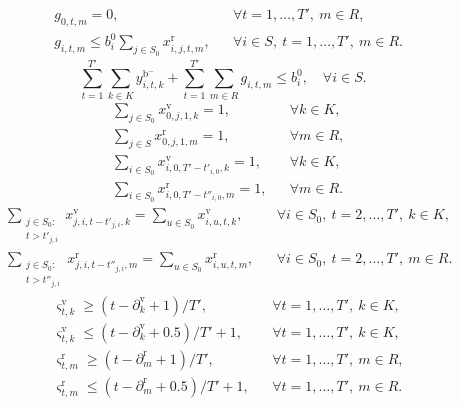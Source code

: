 \begin{subequations}\label{eq:repair-rules}
\begin{align}
&g_{0,t,m}
=0,
&&\forall t=1,\ldots,T',\ m\in R, \label{eq:no-depot-repair}\\
&g_{i,t,m}
\le b_i^0\sum_{j\in S_0}x_{i,j,t,m}^{\mathrm{r}},
&&\forall i\in S,\ t=1,\ldots,T',\ m\in R. \label{eq:repair-visit-link}
\end{align}
\end{subequations}
\begin{equation}
\sum_{t=1}^{T'}\sum_{k\in K}y_{i,t,k}^{\mathrm{b}^{-}}
+\sum_{t=1}^{T'}\sum_{m\in R}g_{i,t,m}
\le b_i^0,
\quad \forall i\in S.
\label{eq:broken-handling-limit}
\end{equation}
\begin{subequations}\label{eq:start-return}
\begin{align}
&\sum_{j\in S_0}x_{0,j,1,k}^{\mathrm{v}}
=1,
&&\forall k\in K, \label{eq:truck-start}\\
&\sum_{j\in S}x_{0,j,1,m}^{\mathrm{r}}
=1,
&&\forall m\in R, \label{eq:repairer-start}\\
&\sum_{i\in S_0}x_{i,0,T'-t'_{i,0},k}^{\mathrm{v}}
=1,
&&\forall k\in K, \label{eq:truck-return}\\
&\sum_{i\in S_0}x_{i,0,T'-t''_{i,0},m}^{\mathrm{r}}
=1,
&&\forall m\in R. \label{eq:repairer-return}
\end{align}
\end{subequations}
\begin{subequations}\label{eq:flow-conservation}
\begin{align}
&\sum_{\substack{j\in S_0:\\ t>t'_{j,i}}}
x_{j,i,t-t'_{j,i},k}^{\mathrm{v}}
=\sum_{u\in S_0}x_{i,u,t,k}^{\mathrm{v}},
&&\forall i\in S_0,\ t=2,\ldots,T',\ k\in K, \label{eq:truck-flow}\\
&\sum_{\substack{j\in S_0:\\ t>t''_{j,i}}}
x_{j,i,t-t''_{j,i},m}^{\mathrm{r}}
=\sum_{u\in S_0}x_{i,u,t,m}^{\mathrm{r}},
&&\forall i\in S_0,\ t=2,\ldots,T',\ m\in R. \label{eq:repairer-flow}
\end{align}
\end{subequations}
\begin{subequations}\label{eq:depot-stay}
\begin{align}
&\varsigma_{t,k}^{\mathrm{v}}
\ge (t-\partial_k^{\mathrm{v}}+1)/T',
&&\forall t=1,\ldots,T',\ k\in K, \label{eq:truck-stay-lower}\\
&\varsigma_{t,k}^{\mathrm{v}}
\le (t-\partial_k^{\mathrm{v}}+0.5)/T'+1,
&&\forall t=1,\ldots,T',\ k\in K, \label{eq:truck-stay-upper}\\
&\varsigma_{t,m}^{\mathrm{r}}
\ge (t-\partial_m^{\mathrm{r}}+1)/T',
&&\forall t=1,\ldots,T',\ m\in R, \label{eq:repairer-stay-lower}\\
&\varsigma_{t,m}^{\mathrm{r}}
\le (t-\partial_m^{\mathrm{r}}+0.5)/T'+1,
&&\forall t=1,\ldots,T',\ m\in R. \label{eq:repairer-stay-upper}
\end{align}
\end{subequations}
